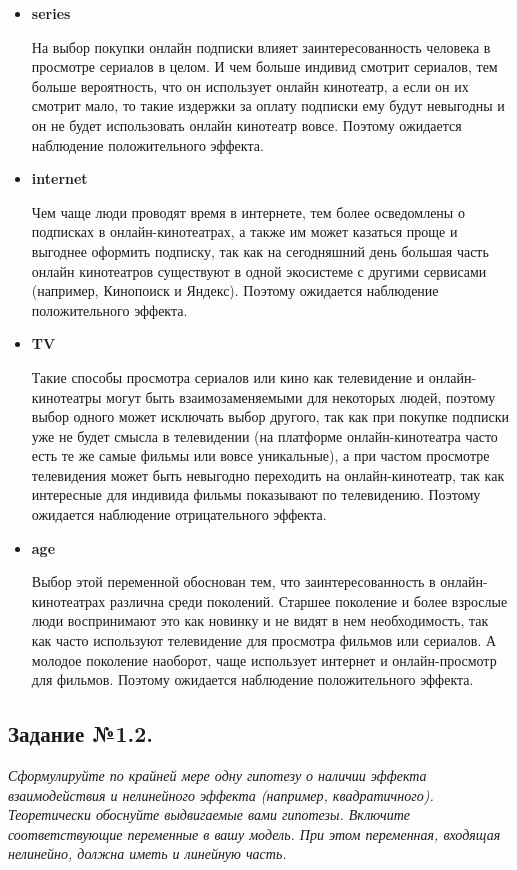 \documentclass[a4paper,12pt]{article}
\begin{document}
	\begin{itemize}
		\item \textbf{series}
		
		На выбор покупки онлайн подписки влияет заинтересованность человека в просмотре сериалов в целом. И чем больше индивид смотрит сериалов, тем больше вероятность, что он использует онлайн кинотеатр, а если он их смотрит мало, то такие издержки за оплату подписки ему будут невыгодны и он не будет использовать онлайн кинотеатр вовсе. Поэтому ожидается наблюдение положительного эффекта.
		
		
		\item \textbf{internet}
		
		Чем чаще люди проводят время в интернете, тем более осведомлены о подписках в онлайн-кинотеатрах, а также им может казаться проще и выгоднее оформить подписку, так как на сегодняшний день большая часть онлайн кинотеатров существуют в одной экосистеме с другими сервисами (например, Кинопоиск и Яндекс). Поэтому ожидается наблюдение положительного эффекта.
		
		\item \textbf{TV}
		
		Такие способы просмотра сериалов или кино как телевидение и онлайн-кинотеатры могут быть взаимозаменяемыми для некоторых людей, поэтому выбор одного может исключать выбор другого, так как при покупке подписки уже не будет смысла в телевидении (на платформе онлайн-кинотеатра часто есть те же самые фильмы или вовсе уникальные), а при частом просмотре телевидения может быть невыгодно переходить на онлайн-кинотеатр, так как интересные для индивида фильмы показывают по телевидению. Поэтому ожидается наблюдение отрицательного эффекта.
		
		\item \textbf{age}
		
		Выбор этой переменной обоснован тем, что заинтересованность в онлайн-кинотеатрах различна среди поколений. Старшее поколение и более взрослые люди воспринимают это как новинку и не видят в нем необходимость, так как часто используют телевидение для просмотра фильмов или сериалов. А молодое поколение наоборот, чаще использует интернет и онлайн-просмотр для фильмов. Поэтому ожидается наблюдение положительного эффекта.
	\end{itemize}

	\vspace{1cm}

	\subsection{Задание №1.2.}
		\textit{
				Сформулируйте по крайней мере одну гипотезу о наличии эффекта взаимодействия и нелинейного эффекта (например, квадратичного). Теоретически обоснуйте выдвигаемые вами гипотезы. Включите соответствующие переменные в вашу модель. При этом переменная, входящая нелинейно, должна иметь и линейную часть.
	}
\end{document}
